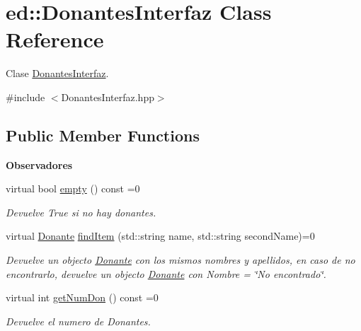 \hypertarget{classed_1_1DonantesInterfaz}{}\section{ed\+:\+:Donantes\+Interfaz Class Reference}
\label{classed_1_1DonantesInterfaz}


Clase \hyperlink{classed_1_1DonantesInterfaz}{Donantes\+Interfaz}.  




{\ttfamily \#include $<$Donantes\+Interfaz.\+hpp$>$}

\subsection*{Public Member Functions}
\begin{Indent}{\bf Observadores}\par
\begin{DoxyCompactItemize}
\item 
virtual bool \hyperlink{classed_1_1DonantesInterfaz_a135d0f86e8527e293c9a7d54ed7013d1}{empty} () const =0
\begin{DoxyCompactList}\small\item\em Devuelve True si no hay donantes. \end{DoxyCompactList}\item 
virtual \hyperlink{classed_1_1Donante}{Donante} \hyperlink{classed_1_1DonantesInterfaz_a572b0a3009679962d1716cf06b84ef58}{find\+Item} (std\+::string name, std\+::string second\+Name)=0
\begin{DoxyCompactList}\small\item\em Devuelve un objecto \hyperlink{classed_1_1Donante}{Donante} con los mismos nombres y apellidos, en caso de no encontrarlo, devuelve un objecto \hyperlink{classed_1_1Donante}{Donante} con Nombre = \char`\"{}\+No encontrado\char`\"{}. \end{DoxyCompactList}\item 
virtual int \hyperlink{classed_1_1DonantesInterfaz_a49b0d5aa9dd84645bf26475253af935a}{get\+Num\+Don} () const =0
\begin{DoxyCompactList}\small\item\em Devuelve el numero de Donantes. \end{DoxyCompactList}\end{DoxyCompactItemize}
\end{Indent}
